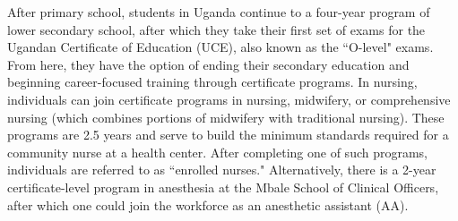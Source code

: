 \documentclass[12pt]{article} %
\begin{document}
After primary school, students in Uganda continue to a four-year program of lower secondary school, after which they take their first set of exams for the Ugandan Certificate of Education (UCE), also known as the ``O-level" exams. From here, they have the option of ending their secondary education and beginning career-focused training through certificate programs.  
\cite{UNFPA2009}
In nursing, individuals can join certificate programs in nursing, midwifery, or comprehensive nursing (which combines portions of midwifery with traditional nursing). 
These programs are 2.5 years and serve to build the minimum standards required for a community nurse at a health center. After completing one of such programs, individuals are referred to as ``enrolled nurses."
\cite{Klopper2012-pp}
Alternatively, there is a 2-year certificate-level program in anesthesia at the Mbale School of Clinical Officers, after which one could join the workforce as an anesthetic assistant (AA). 
\end{document}
